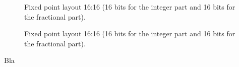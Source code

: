 \begin{figure}[H]
 \centering
  
 \caption{Fixed point layout 16:16 (16 bits for the integer part and 16 bits for the fractional part).} \label{fig:mips}
\end{figure}

\begin{figure}[H]
 \centering
  
 \caption{Fixed point layout 16:16 (16 bits for the integer part and 16 bits for the fractional part).} \label{fig:mips}
\end{figure}

\pagebreak
Bla
\pagebreak

